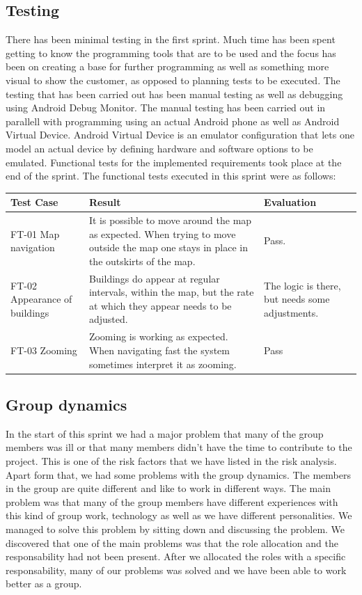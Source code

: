 \subsection{Testing}
	There has been minimal testing in the first sprint. Much time has been spent getting to know 
	the programming tools that are to be used and the focus has been on creating a base for further 
	programming as well as something more visual to show the customer, as opposed to planning tests 
	to be executed. The testing that has been carried out has been manual testing as well as 
	debugging using Android Debug Monitor. The manual testing has been carried out in parallell 
	with programming using an actual Android phone as well as Android Virtual Device. Android Virtual Device 
	is an emulator configuration that lets one model an actual device by defining hardware and 
	software options to be emulated. Functional tests for the implemented requirements took place at 
	the end of the sprint. The functional tests executed in this sprint were as follows:


\begin{tabular}{| p{2cm} | p{7cm} | p{2cm} |}
	\hline
	\rowcolor{lightgray}
	{\bf Test Case} & {\bf Result} & {\bf Evaluation} \\ \hline
	FT-01 Map navigation & It is possible to move around the map as expected. When trying to move outside the map one stays in place in the outskirts of the map. & Pass. \\ \hline
  	FT-02 Appearance of buildings & Buildings do appear at regular intervals, within the map, but the rate at which they appear needs to be adjusted. & The logic is there, but needs some adjustments. \\ \hline
	FT-03 Zooming & Zooming is working as expected. When navigating fast the system sometimes interpret it as zooming. & Pass \\ \hline
\end{tabular}

\subsection{Group dynamics}
	In the start of this sprint we had a major problem that many of the group members was ill or 
	that many members didn't have the time to contribute to the project. 
	This is one of the risk factors 
	that we have listed in the risk analysis. 
	Apart form that, we had some problems with the group dynamics. The members in the group are 
	quite different and like to work in different ways. The main problem was 
	that many of the group members
	have different experiences with this kind of group work, technology as well as we have 
	different personalities.
	We managed to solve this problem by sitting down and discussing the problem. We discovered that
	one of the main problems was that the role allocation and the responsability had not 
	been present.
	After we allocated the roles with a specific responsability, many of our problems was solved and
	we have been able to work better as a group.

